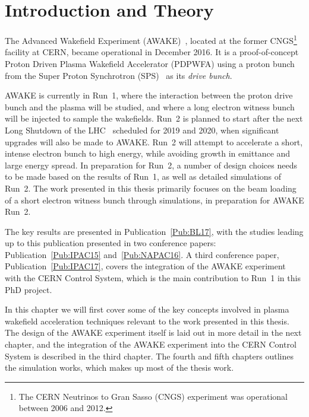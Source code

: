 %
%

\chapter{Introduction and Theory}
\label{Ch:Intro}

The Advanced Wakefield Experiment (AWAKE)~\cite{awake_collaboration:2014}, located at the former CNGS\footnote{The CERN Neutrinos to Gran Sasso (CNGS) experiment was operational between 2006 and 2012.} facility at CERN, became operational in December 2016.
It is a proof-of-concept Proton Driven Plasma Wakefield Accelerator (PDPWFA) using a proton bunch from the Super Proton Synchrotron (SPS)~\cite{benedikt:2004} as its \textit{drive bunch}.

AWAKE is currently in Run~1, where the interaction between the proton drive bunch and the plasma will be studied, and where a long electron witness bunch will be injected to sample the wakefields.
Run~2 is planned to start after the next Long Shutdown of the LHC~\cite{bernardini:2016} scheduled for 2019 and 2020, when significant upgrades will also be made to AWAKE.
Run~2 will attempt to accelerate a short, intense electron bunch to high energy, while avoiding growth in emittance and large energy spread.
In preparation for Run~2, a number of design choices needs to be made based on the results of Run~1, as well as detailed simulations of Run~2.
The work presented in this thesis primarily focuses on the beam loading of a short electron witness bunch through simulations, in preparation for AWAKE Run~2.

The key results are presented in Publication~\ref{Pub:BL17}, with the studies leading up to this publication presented in two conference papers: Publication~\ref{Pub:IPAC15} and~\ref{Pub:NAPAC16}.
A third conference paper, Publication~\ref{Pub:IPAC17}, covers the integration of the AWAKE experiment with the CERN Control System, which is the main contribution to Run~1 in this PhD project.

In this chapter we will first cover some of the key concepts involved in plasma wakefield acceleration techniques relevant to the work presented in this thesis.
The design of the AWAKE experiment itself is laid out in more detail in the next chapter, and the integration of the AWAKE experiment into the CERN Control System is described in the third chapter.
The fourth and fifth chapters outlines the simulation works, which makes up most of the thesis work.

